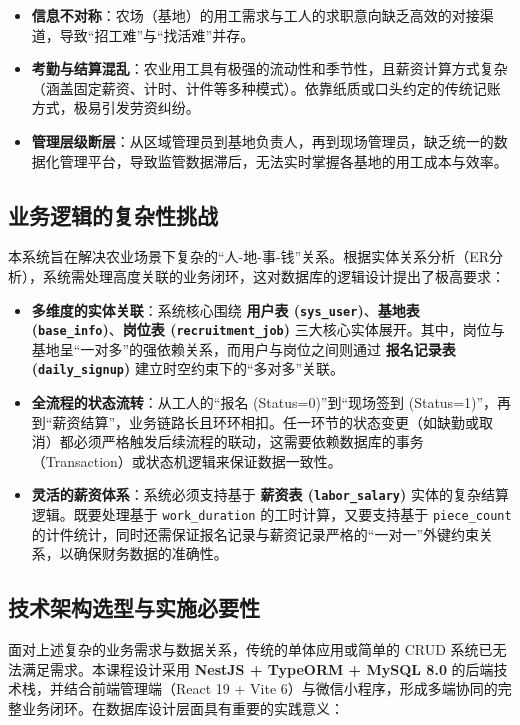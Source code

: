 \documentclass[UTF8,a4paper,12pt]{article}
\begin{document}
\begin{itemize}
    \item \textbf{信息不对称}：农场（基地）的用工需求与工人的求职意向缺乏高效的对接渠道，导致“招工难”与“找活难”并存。
    \item \textbf{考勤与结算混乱}：农业用工具有极强的流动性和季节性，且薪资计算方式复杂（涵盖固定薪资、计时、计件等多种模式）。依靠纸质或口头约定的传统记账方式，极易引发劳资纠纷。
    \item \textbf{管理层级断层}：从区域管理员到基地负责人，再到现场管理员，缺乏统一的数据化管理平台，导致监管数据滞后，无法实时掌握各基地的用工成本与效率。
\end{itemize}

\subsection{业务逻辑的复杂性挑战}
本系统旨在解决农业场景下复杂的“人-地-事-钱”关系。根据实体关系分析（ER分析），系统需处理高度关联的业务闭环，这对数据库的逻辑设计提出了极高要求：

\begin{itemize}
    \item \textbf{多维度的实体关联}：系统核心围绕 \textbf{用户表 (\texttt{sys\_user})}、\textbf{基地表 (\texttt{base\_info})}、\textbf{岗位表 (\texttt{recruitment\_job})} 三大核心实体展开。其中，岗位与基地呈“一对多”的强依赖关系，而用户与岗位之间则通过 \textbf{报名记录表 (\texttt{daily\_signup})} 建立时空约束下的“多对多”关联。
    
    \item \textbf{全流程的状态流转}：从工人的“报名 (Status=0)”到“现场签到 (Status=1)”，再到“薪资结算”，业务链路长且环环相扣。任一环节的状态变更（如缺勤或取消）都必须严格触发后续流程的联动，这需要依赖数据库的事务（Transaction）或状态机逻辑来保证数据一致性。
    
    \item \textbf{灵活的薪资体系}：系统必须支持基于 \textbf{薪资表 (\texttt{labor\_salary})} 实体的复杂结算逻辑。既要处理基于 \texttt{work\_duration} 的工时计算，又要支持基于 \texttt{piece\_count} 的计件统计，同时还需保证报名记录与薪资记录严格的“一对一”外键约束关系，以确保财务数据的准确性。
\end{itemize}

\subsection{技术架构选型与实施必要性}
面对上述复杂的业务需求与数据关系，传统的单体应用或简单的 CRUD 系统已无法满足需求。本课程设计采用 \textbf{NestJS + TypeORM + MySQL 8.0} 的后端技术栈，并结合前端管理端（React 19 + Vite 6）与微信小程序，形成多端协同的完整业务闭环。在数据库设计层面具有重要的实践意义：
\end{document}

